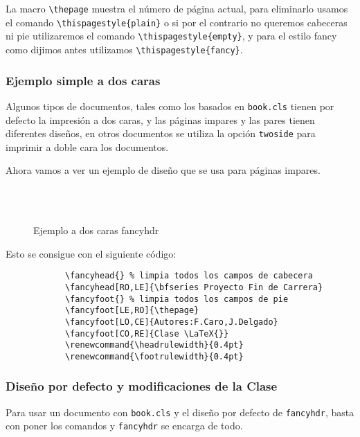 		La macro \verb+\thepage+ muestra el número de página actual, para eliminarlo usamos el comando \verb+\thispagestyle{plain}+ o si por el contrario no queremos cabeceras ni pie utilizaremos el comando \verb+\thispagestyle{empty}+,  y para el estilo fancy como dijimos antes utilizamos \verb+\thispagestyle{fancy}+.


		\subsubsection{Ejemplo simple a dos caras}

		Algunos tipos de documentos, tales como los basados en \verb+book.cls+ tienen por defecto la impresión a dos caras, y las páginas impares y las pares tienen diferentes diseños, en otros documentos se utiliza la opción \verb+twoside+ para imprimir  a doble cara los documentos.
		
		Ahora vamos a ver un ejemplo de diseño que se usa para páginas impares.
		\begin{figure}[h]
		\begin{fblock}
			\noindent{}
			\noindent\makebox[\textwidth]{\hrulefill}\\[\baselineskip]
			\noindent{}\\[\baselineskip]
			\noindent\makebox[\textwidth]{\hrulefill}
			\noindent{}
		\end{fblock}
		\caption{Ejemplo a dos caras fancyhdr}
		\label{fig:ejemdoscarasfancy}
		\end{figure}


		
		\noindent Esto se consigue con el siguiente código:\\
		\begin{center}
		\begin{verbatim}
			\fancyhead{} % limpia todos los campos de cabecera
			\fancyhead[RO,LE]{\bfseries Proyecto Fin de Carrera}
			\fancyfoot{} % limpia todos los campos de pie
			\fancyfoot[LE,RO]{\thepage}
			\fancyfoot[LO,CE]{Autores:F.Caro,J.Delgado}
			\fancyfoot[CO,RE]{Clase \LaTeX{}}
			\renewcommand{\headrulewidth}{0.4pt}
			\renewcommand{\footrulewidth}{0.4pt}
		\end{verbatim}
		\end{center}

		\subsubsection{Diseño por defecto y modificaciones de la Clase}
		Para usar un documento con \verb+book.cls+ y el diseño por defecto  de \verb+fancyhdr+, basta con poner los comandos y \verb+fancyhdr+ se encarga de todo.
		
